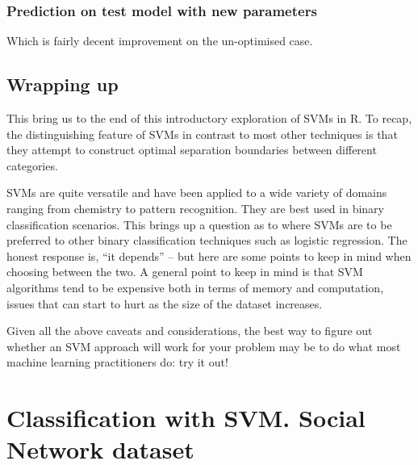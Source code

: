 \documentclass[]{book}
\newenvironment{Shaded}{\begin{snugshade}}{\end{snugshade}}
\newcommand{\CommentTok}[1]{\textcolor[rgb]{0.56,0.35,0.01}{\textit{#1}}}
\newcommand{\KeywordTok}[1]{\textcolor[rgb]{0.13,0.29,0.53}{\textbf{#1}}}
\newcommand{\NormalTok}[1]{#1}
\newcommand{\OperatorTok}[1]{\textcolor[rgb]{0.81,0.36,0.00}{\textbf{#1}}}
\begin{document}
\hypertarget{prediction-on-test-model-with-new-parameters}{%
\subsection{Prediction on test model with new parameters}\label{prediction-on-test-model-with-new-parameters}}

\begin{Shaded}
\end{Shaded}

Which is fairly decent improvement on the un-optimised case.

\hypertarget{wrapping-up}{%
\section{Wrapping up}\label{wrapping-up}}

This bring us to the end of this introductory exploration of SVMs in R. To recap, the distinguishing feature of SVMs in contrast to most other techniques is that they attempt to construct optimal separation boundaries between different categories.

SVMs are quite versatile and have been applied to a wide variety of domains ranging from chemistry to pattern recognition. They are best used in binary classification scenarios. This brings up a question as to where SVMs are to be preferred to other binary classification techniques such as logistic regression. The honest response is, ``it depends'' -- but here are some points to keep in mind when choosing between the two. A general point to keep in mind is that SVM algorithms tend to be expensive both in terms of memory and computation, issues that can start to hurt as the size of the dataset increases.

Given all the above caveats and considerations, the best way to figure out whether an SVM approach will work for your problem may be to do what most machine learning practitioners do: try it out!

\hypertarget{classification-with-svm.-social-network-dataset}{%
\chapter{Classification with SVM. Social Network dataset}\label{classification-with-svm.-social-network-dataset}}
\end{document}
